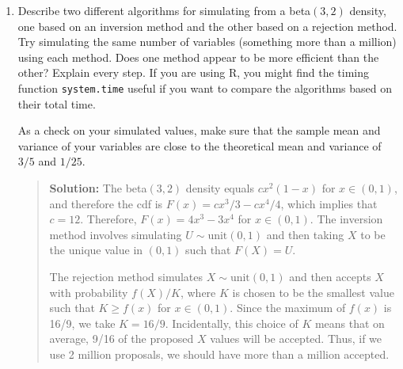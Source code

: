 \documentclass{article}
\begin{document}
\begin{enumerate}
\begin{enumerate}
    \end{enumerate}
    
  \item Describe two different algorithms for simulating from a beta$(3,2)$
  density, one based on an inversion method and the other based on a rejection
  method. Try simulating the same number of variables (something more than a
  million) using each method. Does one method appear to be more efficient than
  the other? Explain every step. If you are using R, you might find the timing
  function {\tt system.time} useful if you want to compare the algorithms based
  on their total time.
  
  As a check on your simulated values, make sure that the sample mean and
  variance of your variables are close to the theoretical mean and variance of
  $3/5$ and $1/25$.
    \begin{quotation}{\bf Solution:}
    The beta$(3,2)$ density equals $cx^2(1-x)$ for $x\in(0,1)$, and therefore
    the cdf is $F(x) = cx^3/3 - cx^4/4$, which implies that $c=12$.  Therefore,
    $F(x) = 4x^3 - 3x^4$ for $x\in(0,1)$.  The inversion method involves simulating 
    $U\sim \mbox{unit}(0,1)$ and then taking $X$ to be the unique value 
    in $(0,1)$ such that $F(X) = U$.
    
    The rejection method simulates $X\sim\mbox{unit}(0,1)$ and then
    accepts $X$ with probability $f(X)/K$, where $K$ is chosen to be the smallest
    value such that $K\ge f(x)$ for $x\in(0,1)$.  Since the maximum of $f(x)$
    is 16/9, we take $K=16/9$.  Incidentally, this choice of $K$ means that on 
    average, 9/16 of the proposed $X$ values will be accepted.  Thus, if we 
    use 2 million proposals, we should have more than a million accepted.  
    

\end{quotation}
\end{enumerate}
\end{document}

